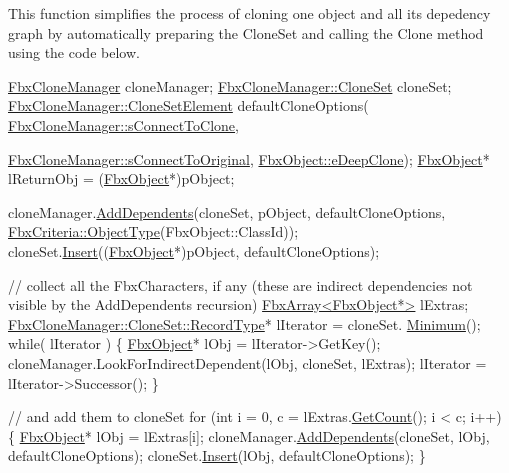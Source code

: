 This function simplifies the process of cloning one object and all its depedency graph by automatically preparing the Clone\+Set and calling the Clone method using the code below.


\begin{DoxyCode}
\hyperlink{class_fbx_clone_manager}{FbxCloneManager}                  cloneManager;
\hyperlink{class_fbx_map}{FbxCloneManager::CloneSet}        cloneSet;
\hyperlink{struct_fbx_clone_manager_1_1_clone_set_element}{FbxCloneManager::CloneSetElement} defaultCloneOptions(
      \hyperlink{class_fbx_clone_manager_ab70c9534523f7e45b21372ff0b2eb109}{FbxCloneManager::sConnectToClone},
                                                     
      \hyperlink{class_fbx_clone_manager_a5a951074ea2c085555fa95b877c56591}{FbxCloneManager::sConnectToOriginal}, 
                                                     \hyperlink{class_fbx_object_a9f5626b2d2135684d6ea1e6e4ad2acbbaacdf137ca059c572798287e98c4236d0}{FbxObject::eDeepClone});
\hyperlink{class_fbx_object}{FbxObject}* lReturnObj = (\hyperlink{class_fbx_object}{FbxObject}*)pObject;

cloneManager.\hyperlink{class_fbx_clone_manager_a3a7786f536d8f61f0b84f114e6e870d2}{AddDependents}(cloneSet, pObject, defaultCloneOptions, 
      \hyperlink{class_fbx_criteria_a760d66022a8febcd3fd0c5fbbb534023}{FbxCriteria::ObjectType}(FbxObject::ClassId));    
cloneSet.\hyperlink{class_fbx_map_a520c1d971dfe2401aa3d9824a0344ce4}{Insert}((\hyperlink{class_fbx_object}{FbxObject}*)pObject, defaultCloneOptions); 

\textcolor{comment}{// collect all the FbxCharacters, if any (these are indirect dependencies not visible by the AddDependents
       recursion)}
\hyperlink{class_fbx_array}{FbxArray<FbxObject*>} lExtras;
\hyperlink{class_fbx_map_af8fc887461b3bf29f41aa36d15ddb54f}{FbxCloneManager::CloneSet::RecordType}* lIterator = cloneSet.
      \hyperlink{class_fbx_map_a12efe88fe10227cf0aca2284a3474193}{Minimum}();
\textcolor{keywordflow}{while}( lIterator )
\{
    \hyperlink{class_fbx_object}{FbxObject}* lObj = lIterator->GetKey();
    cloneManager.LookForIndirectDependent(lObj, cloneSet, lExtras);
    lIterator = lIterator->Successor();
\}

\textcolor{comment}{// and add them to cloneSet}
\textcolor{keywordflow}{for} (\textcolor{keywordtype}{int} i = 0, c = lExtras.\hyperlink{class_fbx_array_a7a47b85464e00634fb9fce26409c7d2a}{GetCount}(); i < c; i++)
\{
    \hyperlink{class_fbx_object}{FbxObject}* lObj = lExtras[i];
    cloneManager.\hyperlink{class_fbx_clone_manager_a3a7786f536d8f61f0b84f114e6e870d2}{AddDependents}(cloneSet, lObj, defaultCloneOptions);
    cloneSet.\hyperlink{class_fbx_map_a520c1d971dfe2401aa3d9824a0344ce4}{Insert}(lObj, defaultCloneOptions); 
\}


\end{DoxyCode}
